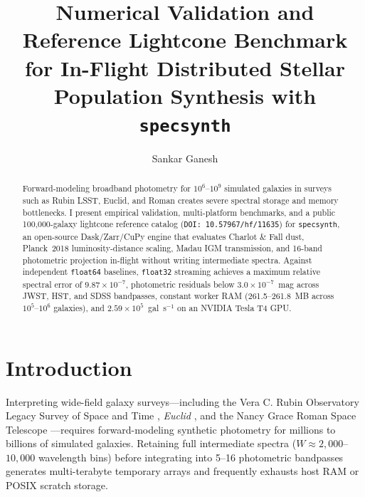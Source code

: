 \documentclass[RNAAS]{aastex7}
\begin{document}
\title{Numerical Validation and Reference Lightcone Benchmark for In-Flight Distributed Stellar Population Synthesis with \texttt{specsynth}}

\author[0009-0006-1590-1356]{Sankar Ganesh}

\begin{abstract}
Forward-modeling broadband photometry for $10^6$--$10^9$ simulated galaxies in surveys such as Rubin LSST, Euclid, and Roman creates severe spectral storage and memory bottlenecks. I present empirical validation, multi-platform benchmarks, and a public 100,000-galaxy lightcone reference catalog (\texttt{DOI: 10.57967/hf/11635}) for \texttt{specsynth}, an open-source Dask/Zarr/CuPy engine that evaluates Charlot \& Fall dust, Planck~2018 luminosity-distance scaling, Madau IGM transmission, and 16-band photometric projection in-flight without writing intermediate spectra. Against independent \texttt{float64} baselines, \texttt{float32} streaming achieves a maximum relative spectral error of $9.87\times 10^{-7}$, photometric residuals below $3.0\times 10^{-7}$~mag across JWST, HST, and SDSS bandpasses, constant worker RAM (261.5--261.8~MB across $10^5$--$10^6$ galaxies), and $2.59\times 10^5$~gal~s$^{-1}$ on an NVIDIA Tesla T4 GPU.
\end{abstract}


\section{Introduction}

Interpreting wide-field galaxy surveys---including the Vera C. Rubin Observatory Legacy Survey of Space and Time \citep[LSST;][]{ivezic2019lsst}, \textit{Euclid} \citep{mellier2025euclid}, and the Nancy Grace Roman Space Telescope \citep{akeson2019wfirst}---requires forward-modeling synthetic photometry for millions to billions of simulated galaxies. Retaining full intermediate spectra ($W \approx 2{,}000$--$10{,}000$ wavelength bins) before integrating into 5--16 photometric bandpasses generates multi-terabyte temporary arrays and frequently exhausts host RAM or POSIX scratch storage.
\end{document}
